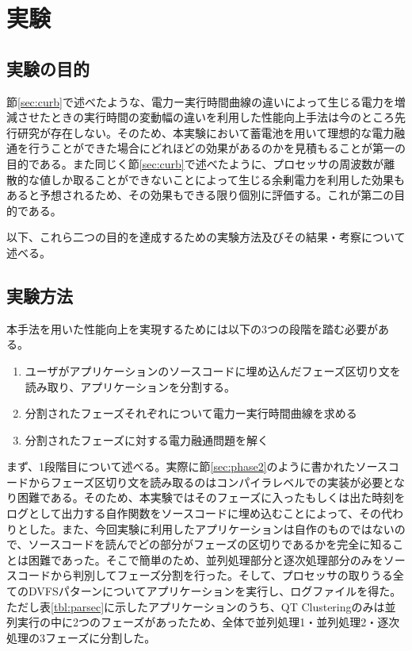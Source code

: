 \chapter{実験}
\label{chap:exeperiment}


\section{実験の目的}
\label{sec:purpose}

節\ref{sec:curb}で述べたような、電力ー実行時間曲線の違いによって生じる電力を増減させたときの実行時間の変動幅の違いを利用した性能向上手法は今のところ先行研究が存在しない。そのため、本実験において蓄電池を用いて理想的な電力融通を行うことができた場合にどれほどの効果があるのかを見積もることが第一の目的である。また同じく節\ref{sec:curb}で述べたように、プロセッサの周波数が離散的な値しか取ることができないことによって生じる余剰電力を利用した効果もあると予想されるため、その効果もできる限り個別に評価する。これが第二の目的である。

以下、これら二つの目的を達成するための実験方法及びその結果・考察について述べる。


\section{実験方法}
\label{sec:method}

本手法を用いた性能向上を実現するためには以下の3つの段階を踏む必要がある。

\begin{enumerate}
\item ユーザがアプリケーションのソースコードに埋め込んだフェーズ区切り文を読み取り、アプリケーションを分割する。
\item 分割されたフェーズそれぞれについて電力ー実行時間曲線を求める
\item 分割されたフェーズに対する電力融通問題を解く
\end{enumerate}

まず、1段階目について述べる。実際に節\ref{sec:phase2}のように書かれたソースコードからフェーズ区切り文を読み取るのはコンパイラレベルでの実装が必要となり困難である。そのため、本実験ではそのフェーズに入ったもしくは出た時刻をログとして出力する自作関数をソースコードに埋め込むことによって、その代わりとした。また、今回実験に利用したアプリケーションは自作のものではないので、ソースコードを読んでどの部分がフェーズの区切りであるかを完全に知ることは困難であった。そこで簡単のため、並列処理部分と逐次処理部分のみをソースコードから判別してフェーズ分割を行った。そして、プロセッサの取りうる全てのDVFSパターンについてアプリケーションを実行し、ログファイルを得た。ただし表\ref{tbl:parsec}に示したアプリケーションのうち、QT Clusteringのみは並列実行の中に2つのフェーズがあったため、全体で並列処理1・並列処理2・逐次処理の3フェーズに分割した。

